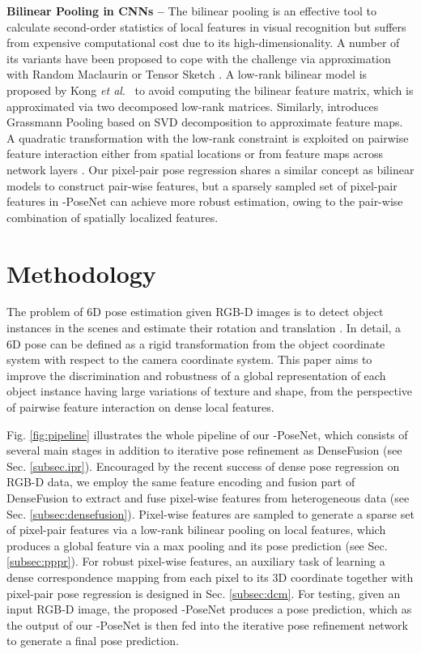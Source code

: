 \documentclass[letterpaper, 10 pt, conference]{ieeeconf}
\def\etal{\emph{et al}.~}
\begin{document}
\vspace{0.1cm}\noindent\textbf{Bilinear Pooling in CNNs --} The
bilinear pooling \cite{lin2015bilinear} is an effective tool to calculate second-order statistics of local features in visual recognition but suffers from expensive computational cost due to its high-dimensionality.
A number of its variants have been proposed to cope with the challenge via approximation with Random Maclaurin \cite{kar2012random} or Tensor Sketch \cite{pham2013fast}. 
A low-rank bilinear model is proposed by Kong \etal \cite{kong2017low} to avoid computing the bilinear feature matrix, which is approximated via two decomposed low-rank matrices. 
Similarly, \cite{wei2018grassmann} introduces Grassmann Pooling based on SVD decomposition to approximate feature maps.
A quadratic transformation with the low-rank constraint is exploited on pairwise feature interaction either from spatial locations \cite{li2017factorized} or from feature maps across network layers \cite{Yu_2018_ECCV}.  
Our pixel-pair pose regression shares a similar concept as bilinear models to construct pair-wise features, but a sparsely sampled set of pixel-pair features in -PoseNet can achieve more robust estimation, owing to the pair-wise combination of spatially localized features. 


\section{Methodology}

The problem of 6D pose estimation given RGB-D images is to detect object instances in the scenes and estimate their rotation  and translation . 
In detail, a 6D pose can be defined as a rigid transformation  from the object coordinate system with respect to the camera coordinate system. 
This paper aims to improve the discrimination and robustness of a global representation of each object instance having large variations of texture and shape, from the perspective of pairwise feature interaction on dense local features.

Fig. \ref{fig:pipeline} illustrates the whole pipeline of our -PoseNet, which consists of several main stages in addition to iterative pose refinement as DenseFusion \cite{wang2019densefusion} (see Sec. \ref{subsec.ipr}).
Encouraged by the recent success of dense pose regression on RGB-D data, we employ the same feature encoding and fusion part of DenseFusion \cite{wang2019densefusion} to extract and fuse pixel-wise features from heterogeneous data (see Sec. \ref{subsec:densefusion}). 
Pixel-wise features are sampled to generate a sparse set of pixel-pair features via a low-rank bilinear pooling on local features, which produces a global feature via a max pooling and its pose prediction (see Sec. \ref{subsec:pppr}).
For robust pixel-wise features, an auxiliary task of learning a dense correspondence mapping from each pixel to its 3D coordinate together with pixel-pair pose regression is designed in Sec. \ref{subsec:dcm}. 
For testing, given an input RGB-D image, the proposed -PoseNet produces a pose prediction, which as the output of our -PoseNet is then fed into the iterative pose refinement network to generate a final pose prediction.
\end{document}
